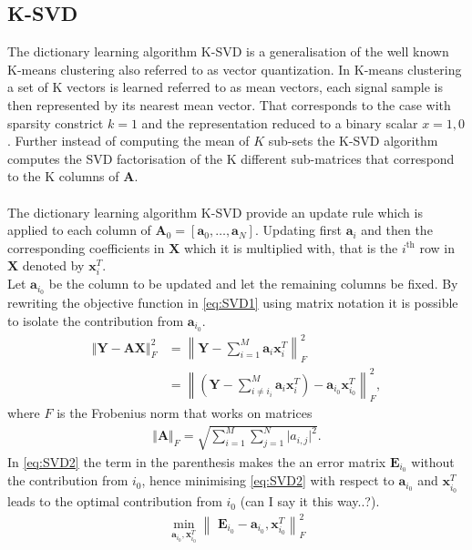 \subsection{K-SVD}
The dictionary learning algorithm K-SVD is a generalisation of the well known K-means clustering also referred to as vector quantization. In K-means clustering a set of K vectors is learned referred to as mean vectors, each signal sample is then represented by its nearest mean vector. That corresponds to the case with sparsity constrict $k=1$ and the representation reduced to a binary scalar $x={1,0}$. Further instead of computing the mean of $K$ sub-sets the K-SVD algorithm computes the SVD factorisation of the K different sub-matrices that correspond to the K columns of $\textbf{A}$.\\
\\
The dictionary learning algorithm K-SVD provide an update rule which is applied to each column of $\textbf{A}_0 = \left[ \textbf{a}_0, \hdots , \textbf{a}_N \right] $. Updating first $\textbf{a}_i$ and then the corresponding coefficients in $\textbf{X}$ which it is multiplied with, that is the $i^{\text{th}}$ row in $\textbf{X}$ denoted by $\textbf{x}_i^T$.\\
Let $\textbf{a}_{i_{0}}$ be the column to be updated and let the remaining columns be fixed. By rewriting the objective function in \eqref{eq:SVD1} using matrix notation it is possible to isolate the contribution from $\textbf{a}_{i_{0}}$.
\begin{align}
\Vert \textbf{Y} - \textbf{AX} \Vert_{F}^{2} 
&= \left\| \textbf{Y} - \sum_{i=1}^{M} \textbf{a}_i \textbf{x}_i^{T} \right\|_{F}^{2}\nonumber\\
&= \left\| \left( \textbf{Y}- \sum_{i\neq i_{i}}^{M} \textbf{a}_i\textbf{x}_i^{T}\right) - \textbf{a}_{i_{0}}\textbf{x}_{i_{0}}^{T} \right\| _{F}^{2},\label{eq:SVD2} 
\end{align}
where $F$ is the Frobenius norm that works on matrices
\begin{align*}
\Vert \mathbf{A} \Vert_F = \sqrt{\sum_{i=1}^M \sum_{j=1}^N \vert a_{i,j} \vert^2}.
\end{align*} 
In \eqref{eq:SVD2} the term in the parenthesis makes the an error matrix $\textbf{E}_{i_0}$ without the contribution from $i_{0}$, hence minimising \eqref{eq:SVD2} with respect to $\textbf{a}_{i_{0}}$ and $\textbf{x}_{i_{0}}^{T}$ leads to the optimal contribution from $i_{0}$ (can I say it this way..?). 
\begin{align}
\min_{\textbf{a}_{i_{0}},\textbf{x}_{i_0}^{T}}\left\|\textbf{ E}_{i_{0}}-\textbf{a}_{i_{0}},\textbf{x}_{i_0}^{T} \right\|_{F}^{2}\label{eq:SVD3}
\end{align} 
